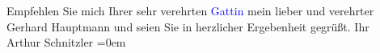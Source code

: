            \pstart
           Empfehlen Sie mich Ihrer sehr verehrten \textcolor{blue}{Gattin}{} mein lieber und verehrter Gerhard
               Hauptmann und seien Sie in herzlicher Ergebenheit gegrüßt.\pend
           \pstart
           Ihr{\\[\baselineskip]}Arthur Schnitzler\pend
           \leftskip=0em{}\endnumbering{}  
      